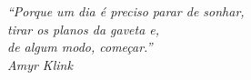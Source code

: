 \begin{epigrafe}
    \vspace*{\fill}
  \begin{flushright}
    \emph{``Porque um dia é preciso parar de sonhar, \\
    tirar os planos da gaveta e, \\
    de algum modo, começar.'' \\
    Amyr Klink}
  \end{flushright}
\end{epigrafe}

